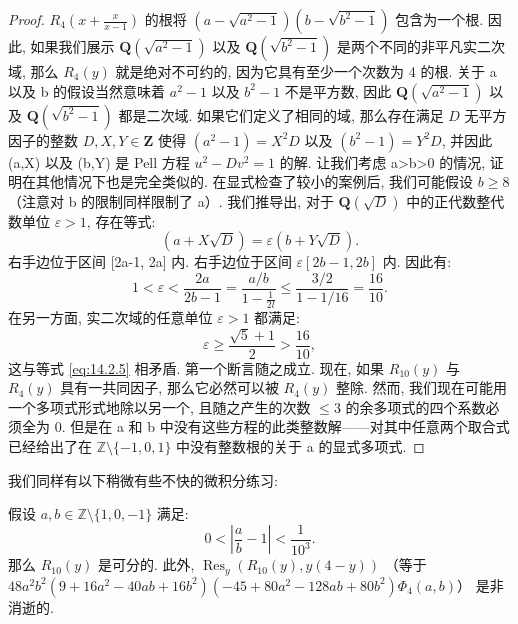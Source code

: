\begin{proof}
\(R_4\left(x+\frac{x}{x-1}\right)\) 的根将 \((a-\sqrt{a^2-1})(b-\sqrt{b^2-1})\) 包含为一个根. 
因此, 如果我们展示 \(\mathbf{Q}(\sqrt{a^2-1})\) 以及 \(\mathbf{Q}(\sqrt{b^2-1})\) 
是两个不同的非平凡实二次域, 那么 \(R_4(y)\) 
就是绝对不可约的, 
因为它具有至少一个次数为 4 的根. 
关于 a 以及 b 的假设当然意味着 \(a^2-1\) 以及 \(b^2-1\) 不是平方数, 
因此 \(\mathbf{Q}(\sqrt{a^2-1})\) 以及 \(\mathbf{Q}(\sqrt{b^2-1})\) 都是二次域. 
如果它们定义了相同的域, 那么存在满足 \(D\) 无平方因子的整数 \(D, X, Y \in \mathbf{Z}\) 
使得 \((a^2-1)=X^2D\) 以及 \((b^2-1)=Y^2D\), 
并因此 (a,X) 以及 (b,Y) 是 Pell 方程 \(u^2-Dv^2=1\) 的解. 
让我们考虑 a>b>0 的情况, 证明在其他情况下也是完全类似的. 
在显式检查了较小的案例后, 我们可能假设 \(b\geq 8\) （注意对 b 的限制同样限制了 a）. 
我们推导出, 对于 \(\mathbf{Q}(\sqrt{D})\) 中的正代数整代数单位 \(\varepsilon>1\), 
存在等式:
\[ (a+X\sqrt{D})=\varepsilon(b+Y\sqrt{D}). \]
右手边位于区间 [2a-1, 2a] 内. 右手边位于区间 \(\varepsilon[2b-1, 2b]\) 内. 
因此有:
\begin{equation}\label{eq:14.2.5}
1 < \varepsilon < \frac{2a}{2b-1} = \frac{a/b}{1 - \frac{1}{2l}} \le \frac{3/2}{1 - 1/16} = \frac{16}{10}.
\end{equation}
在另一方面, 实二次域的任意单位 \(\varepsilon > 1\) 都满足:
\[ \varepsilon \geq \frac{\sqrt{5}+1}{2} > \frac{16}{10}, \]
这与等式 \eqref{eq:14.2.5} 相矛盾. 第一个断言随之成立. 
现在, 如果 \(R_{10}(y)\) 与 \(R_4(y)\) 具有一共同因子, 那么它必然可以被 \(R_4(y)\) 整除. 
然而, 我们现在可能用一个多项式形式地除以另一个, 
且随之产生的次数 \(\leq 3\) 的余多项式的四个系数必须全为 0. 
但是在 a 和 b 中没有这些方程的此类整数解——对其中任意两个取合式已经给出了在 \(\mathbb{Z} \setminus \{-1,0,1\}\) 中没有整数根的关于 a 的显式多项式.
\end{proof}

我们同样有以下稍微有些不快的微积分练习:

\begin{lemma}\label{lem:14.2.6}
假设 \(a, b \in \mathbb{Z} \setminus \{1, 0, -1\}\) 满足:
\[ 0 < \left| \frac{a}{b} - 1 \right| < \frac{1}{10^3}. \]
那么 \(R_{10}(y)\) 是可分的. 此外, \(\operatorname{Res}_y(R_{10}(y), y(4-y))\) 
（等于 \(48a^{2}b^{2}(9+16a^{2}-40ab+16b^{2})(-45+80a^{2}-128ab+80b^{2})\Phi_{4}(a,b)\)） 
是非消逝的.
\end{lemma}

